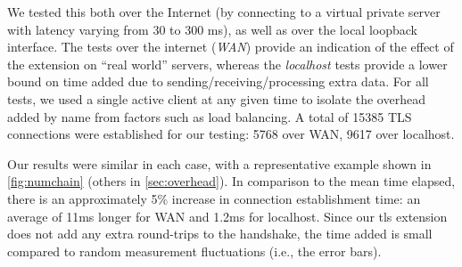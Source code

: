 We tested this both over the Internet (by connecting to a virtual private server
with latency varying from 30 to 300 ms), as well as over the local loopback
interface. The tests over the internet (\emph{WAN}) provide an indication of the
effect of the extension on ``real world'' servers, whereas the \emph{localhost}
tests provide a lower bound on time added due to sending/receiving/processing
extra data. For all tests, we used a single active client at any given time to
isolate the overhead added by \ac{name} from factors such as load balancing. A
total of 15385 TLS connections were established for our testing: 5768 over WAN,
9617 over localhost.

Our results were similar in each case, with a representative example shown in
\autoref{fig:numchain} (others in \autoref{sec:overhead}). In comparison to the
mean time elapsed, there is an approximately 5\% increase in connection
establishment time: an average of 11ms longer for WAN and 1.2ms for localhost.
Since our \ac{tls} extension does not add any extra round-trips to the
handshake, the time added is small compared to random
measurement fluctuations (i.e., the error bars).

